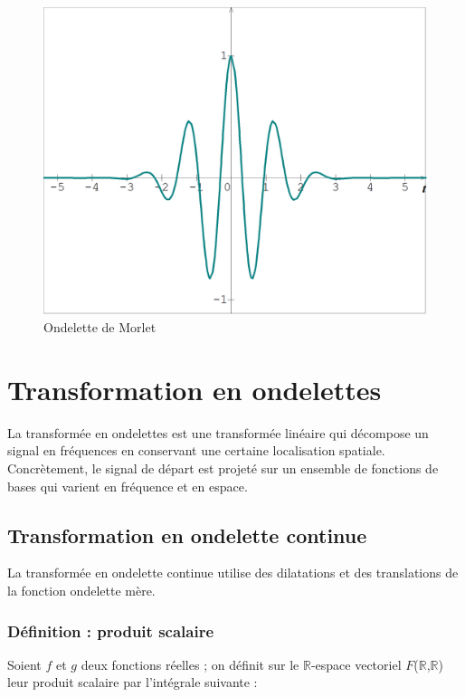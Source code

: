 \documentclass{article}
\begin{document}
\begin{figure}[!h]
\centering
\includegraphics[scale=0.2]{images/morlet.png}
\caption{Ondelette de Morlet}
\label{morlet}
\end{figure}

\pagebreak

\section{Transformation en ondelettes}

La transformée en ondelettes est une transformée linéaire qui décompose un signal en fréquences en conservant une certaine localisation spatiale. Concrètement, le signal de départ est projeté sur un ensemble de fonctions de bases qui varient en fréquence et en espace. 

\subsection{Transformation en ondelette continue}

La transformée en ondelette continue utilise des dilatations et des translations de la fonction ondelette mère. 

\subsubsection*{Définition : produit scalaire}

Soient $f$ et $g$ deux fonctions réelles ; on définit sur le $\mathbb{R}$-espace vectoriel $F$($\mathbb{R}$,$\mathbb{R}$) leur produit scalaire par l’intégrale suivante : \\
\end{document}
